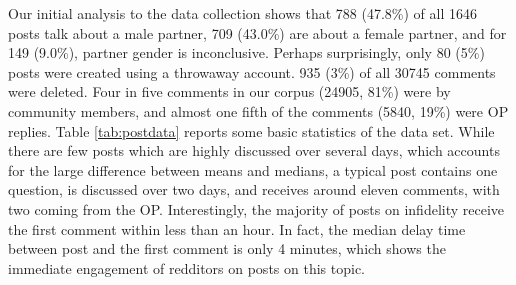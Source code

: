 Our initial analysis to the data collection shows that 788 (47.8\%) of all 1646 posts talk about a male partner, 709 (43.0\%) are about a female partner, and for 149 (9.0\%), partner gender is inconclusive. Perhaps surprisingly, only 80 (5\%) posts were created using a throwaway account. 935 (3\%) of all 30745 comments were deleted. Four in five comments in our corpus (24905, 81\%) were by community members, and almost one fifth of the comments (5840, 19\%) were OP replies.
Table \ref{tab:postdata} reports some basic statistics of the data set. While there are few posts which are highly discussed over several days, which accounts for the large difference between means and medians, a typical  post contains one question, is discussed over two days, and receives around eleven comments, with two coming from the OP. Interestingly, the majority of posts on infidelity receive the first comment within less than an hour. In fact, the median delay time between post and the first comment is only 4 minutes, which shows the immediate engagement of redditors on posts on this topic. 


